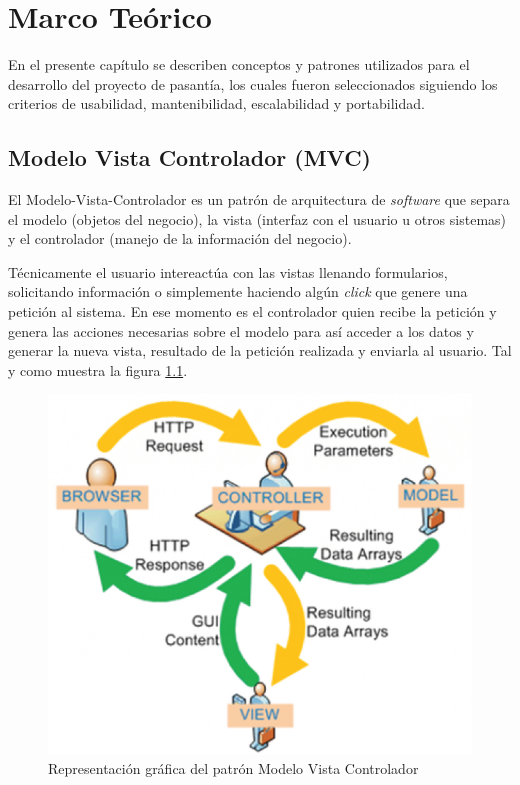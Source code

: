 \chapter{Marco Teórico}

En el presente capítulo se describen conceptos y patrones utilizados para el desarrollo del proyecto de pasantía, los cuales fueron seleccionados siguiendo los criterios de usabilidad, mantenibilidad, escalabilidad y portabilidad.

    \section{Modelo Vista Controlador (MVC)}
    
    El Modelo-Vista-Controlador es un patrón de arquitectura de \textit{software} que separa el modelo (objetos del negocio), la vista (interfaz con el usuario u otros sistemas) y el controlador (manejo de la información del negocio)\cite{MVC-tiw}.
    
    Técnicamente el usuario intereactúa con las vistas llenando formularios, solicitando información o simplemente haciendo algún \textit{click} que genere una petición al sistema. En ese momento es el controlador quien recibe la petición y genera las acciones necesarias sobre el modelo para así acceder a los datos y generar la nueva vista, resultado de la petición realizada y enviarla al usuario. Tal y como muestra la figura \ref{mvc-image}.
    
    \begin{figure}[htbp!] %
        \begin{center}
            \includegraphics[width=.7\textwidth]{figures/mvc}
        \end{center}
        \caption{Representación gráfica del patrón Modelo Vista Controlador\cite{MVC-imagen}}
        \label{mvc-image}
    \end{figure}
    
